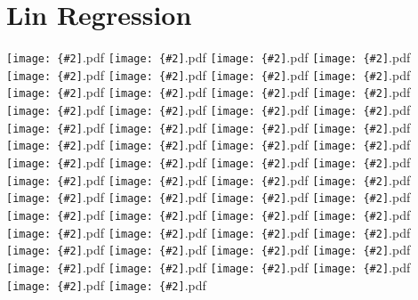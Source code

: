 \documentclass[12pt,a4paper]{article}
\newcommand{\pdffig}[2][0.5]{\texttt{[image: \{\#2]}.pdf}}
\begin{document}
\section{Lin Regression}
\pdffig[0.5]{Lin_Regression_Aus_tsfc_u_hig}
\pdffig[0.5]{Lin_Regression_Aus_tsfc_u_low}
\pdffig[0.5]{Lin_Regression_Aus_tsfc_v_high}
\pdffig[0.5]{Lin_Regression_Aus_tsfc_v_low}
\pdffig[0.5]{Lin_Regression_Aus_tsfc_w_high}
\pdffig[0.5]{Lin_Regression_Aus_tsfc_w_low}
\pdffig[0.5]{Lin_Regression_India_tsfc_u_hig}
\pdffig[0.5]{Lin_Regression_India_tsfc_u_low}
\pdffig[0.5]{Lin_Regression_India_tsfc_v_high}
\pdffig[0.5]{Lin_Regression_India_tsfc_v_low}
\pdffig[0.5]{Lin_Regression_India_tsfc_w_high}
\pdffig[0.5]{Lin_Regression_India_tsfc_w_low}
\pdffig[0.5]{Lin_Regression_MC_tsfc_u_hig}
\pdffig[0.5]{Lin_Regression_MC_tsfc_u_low}
\pdffig[0.5]{Lin_Regression_MC_tsfc_v_high}
\pdffig[0.5]{Lin_Regression_MC_tsfc_v_low}
\pdffig[0.5]{Lin_Regression_MC_tsfc_w_high}
\pdffig[0.5]{Lin_Regression_MC_tsfc_w_low}
\pdffig[0.5]{Lin_Regression_NthEastAfr_tsfc_u_hig}
\pdffig[0.5]{Lin_Regression_NthEastAfr_tsfc_u_low}
\pdffig[0.5]{Lin_Regression_NthEastAfr_tsfc_v_high}
\pdffig[0.5]{Lin_Regression_NthEastAfr_tsfc_v_low}
\pdffig[0.5]{Lin_Regression_NthEastAfr_tsfc_w_high}
\pdffig[0.5]{Lin_Regression_NthEastAfr_tsfc_w_low}
\pdffig[0.5]{Lin_Regression_NthWestAfr_tsfc_u_hig}
\pdffig[0.5]{Lin_Regression_NthWestAfr_tsfc_u_low}
\pdffig[0.5]{Lin_Regression_NthWestAfr_tsfc_v_high}
\pdffig[0.5]{Lin_Regression_NthWestAfr_tsfc_v_low}
\pdffig[0.5]{Lin_Regression_NthWestAfr_tsfc_w_high}
\pdffig[0.5]{Lin_Regression_NthWestAfr_tsfc_w_low}
\pdffig[0.5]{Lin_Regression_SthAfr_tsfc_u_hig}
\pdffig[0.5]{Lin_Regression_SthAfr_tsfc_u_low}
\pdffig[0.5]{Lin_Regression_SthAfr_tsfc_v_high}
\pdffig[0.5]{Lin_Regression_SthAfr_tsfc_v_low}
\pdffig[0.5]{Lin_Regression_SthAfr_tsfc_w_high}
\pdffig[0.5]{Lin_Regression_SthAfr_tsfc_w_low}
\pdffig[0.5]{Lin_Regression_SthSthAm_tsfc_u_hig}
\pdffig[0.5]{Lin_Regression_SthSthAm_tsfc_u_low}
\pdffig[0.5]{Lin_Regression_SthSthAm_tsfc_v_high}
\pdffig[0.5]{Lin_Regression_SthSthAm_tsfc_v_low}
\pdffig[0.5]{Lin_Regression_SthSthAm_tsfc_w_high}
\pdffig[0.5]{Lin_Regression_SthSthAm_tsfc_w_low}
\pdffig[0.5]{Lin_Regression_TropAfr_tsfc_u_hig}
\pdffig[0.5]{Lin_Regression_TropAfr_tsfc_u_low}
\pdffig[0.5]{Lin_Regression_TropAfr_tsfc_v_high}
\pdffig[0.5]{Lin_Regression_TropAfr_tsfc_v_low}
\pdffig[0.5]{Lin_Regression_TropAfr_tsfc_w_high}
\pdffig[0.5]{Lin_Regression_TropAfr_tsfc_w_low}
\pdffig[0.5]{Lin_Regression_TropSthAm_tsfc_u_hig}
\pdffig[0.5]{Lin_Regression_TropSthAm_tsfc_u_low}
\pdffig[0.5]{Lin_Regression_TropSthAm_tsfc_v_high}
\pdffig[0.5]{Lin_Regression_TropSthAm_tsfc_v_low}
\pdffig[0.5]{Lin_Regression_TropSthAm_tsfc_w_high}
\pdffig[0.5]{Lin_Regression_TropSthAm_tsfc_w_low}
\end{document}
